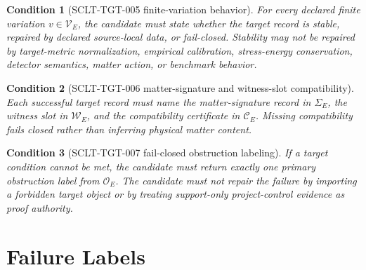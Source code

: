 \documentclass[11pt]{article}
\newtheorem{condition}{Condition}
\begin{document}
\begin{condition}[SCLT-TGT-005 finite-variation behavior]
For every declared finite variation \(v\in\mathcal{V}_E\), the candidate must
state whether the target record is stable, repaired by declared source-local
data, or fail-closed. Stability may not be repaired by target-metric
normalization, empirical calibration, stress-energy conservation, detector
semantics, matter action, or benchmark behavior.
\end{condition}

\begin{condition}[SCLT-TGT-006 matter-signature and witness-slot compatibility]
Each successful target record must name the matter-signature record in
\(\Sigma_E\), the witness slot in \(\mathcal{W}_E\), and the compatibility
certificate in \(\mathcal{C}_E\). Missing compatibility fails closed rather
than inferring physical matter content.
\end{condition}

\begin{condition}[SCLT-TGT-007 fail-closed obstruction labeling]
If a target condition cannot be met, the candidate must return exactly one
primary obstruction label from \(\mathcal{O}_E\). The candidate must not
repair the failure by importing a forbidden target object or by treating
support-only project-control evidence as proof authority.
\end{condition}

\section{Failure Labels}
\end{document}
